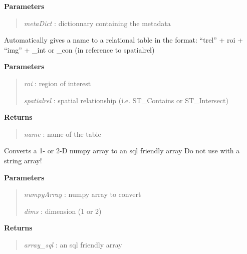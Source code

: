 \documentclass[letterpaper,10pt,openany,oneside]{sphinxmanual}
\begin{document}
\begin{fulllineitems}
\begin{fulllineitems}
\textbf{Parameters}
\begin{quote}

\emph{metaDict} : dictionnary containing the metadata
\end{quote}

\end{fulllineitems}


\begin{fulllineitems}
\label{code:Database.Database.nameRelationTable}
Automatically gives a name to a relational table in the format: ``trel'' + roi + ``img'' + \_int or \_con (in reference to spatialrel)

\textbf{Parameters}
\begin{quote}

\emph{roi}        : region of interest

\emph{spatialrel} : spatial relationship (i.e. ST\_Contains or ST\_Intersect)
\end{quote}

\textbf{Returns}
\begin{quote}

\emph{name}       : name of the table
\end{quote}

\end{fulllineitems}


\begin{fulllineitems}
\label{code:Database.Database.numpy2sql}
Converts a 1- or 2-D numpy array to an sql friendly array
Do not use with a string array!

\textbf{Parameters}
\begin{quote}

\emph{numpyArray} : numpy array to convert

\emph{dims}       : dimension (1 or 2)
\end{quote}

\textbf{Returns}
\begin{quote}

\emph{array\_sql}  : an sql friendly array
\end{quote}

\end{fulllineitems}


\end{fulllineitems}
\end{document}
